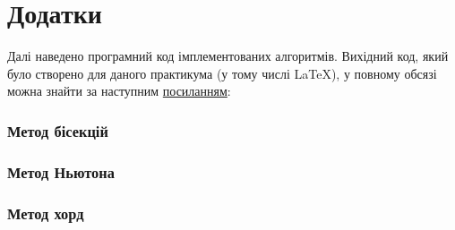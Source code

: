 \section*{\centering Додатки}



Далі наведено програмний код імплементованих алгоритмів.
Вихідний код, який було створено для даного практикума
(у тому числі \LaTeX),
у повному обсязі можна знайти за наступним
\href{https://colab.research.google.com/drive/139J6V_hXOcZL_K_-qSM1CSk3T0zTmQM9?usp=sharing}{посиланням}:

\subsubsection*{Метод бісекцій}


\subsubsection*{Метод Ньютона}


\subsubsection*{Метод хорд}
